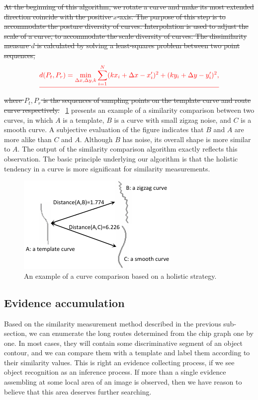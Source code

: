 \documentclass[journal]{IEEEtran}
\providecommand{\DIFdel}[1]{{\protect\color{red}\sout{#1}}}                      %
\providecommand{\DIFdelbegin}{} %
\providecommand{\DIFdelend}{} %
\begin{document}
\DIFdelbegin \DIFdel{At the beginning of this algorithm, we rotate a curve and make its most extended direction coincide with the positive $x$-axis.
The purpose of this step is to accommodate the posture diversity of curves.
Interpolation is used to adjust the scale of a curve,
to accommodate the scale diversity of curves.
The dissimilarity measure $d$ is calculated by solving a least-squares problem between two point sequences, 
}\begin{displaymath}\DIFdel{
d(P_t,P_r)=\min_{\Delta x,\Delta y,k}\sum_{i=1}^{N}(kx_i+\Delta x-x'_i)^2+(ky_i+\Delta y-y'_i)^2,
}\end{displaymath}
\DIFdel{where $P_t,P_r$ is the sequences of sampling points on the template curve and route curve respectively.
}\DIFdelend \figurename~\ref{fig:13} presents an example of a similarity comparison between two curves,
in which $A$ is a template, $B$ is a curve with small zigzag noise, and $C$ is a smooth curve. 
A subjective evaluation of the figure indicates that $B$ and $A$ are more alike than $C$ and $A$. 
Although $B$ has noise, its overall shape is more similar to $A$. 
The output of the similarity comparison algorithm exactly reflects this observation. 
The basic principle underlying our algorithm is that the holistic tendency in a curve is more significant for similarity measurements. 

\begin{figure}[!t]
\centering
\includegraphics[width=0.6\linewidth]{images/fig13.pdf}
\caption{An example of a curve comparison based on a holistic strategy.}
\label{fig:13}
\end{figure}

\subsection{Evidence accumulation}

Based on the similarity measurement method described in the previous sub-section, 
we can enumerate the long routes determined from the chip graph one by one. 
In most cases, they will contain some discriminative segment of an object contour, 
and we can compare them with a template and label them according to their similarity values. 
This is right an evidence collecting process, 
if we see object recognition as an inference process. 
If more than a single evidence assembling at some local area of an image is observed, 
then we have reason to believe that this area deserves further searching.
\end{document}

